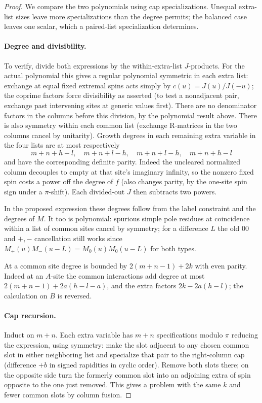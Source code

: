 \begin{proof}
We compare the two polynomials using cap specializations. Unequal extra-list sizes leave more specializations than the degree permits; the balanced case leaves one scalar, which a paired-list specialization determines.

\paragraph{Degree and divisibility.}
To verify, divide both expressions by the within-extra-list \(J\)-products. For the actual polynomial this gives a regular polynomial symmetric in each extra list: exchange at equal fixed extremal spins acts simply by \(c(u)=J(u)/J(-u)\); the coprime factors force divisibility as asserted (to test a nonadjacent pair, exchange past intervening sites at generic values first). There are no denominator factors in the columns before this division, by the polynomial result above. There is also symmetry within each common list (exchange R-matrices in the two columns cancel by unitarity). Growth degrees in each remaining extra variable in the four lists are at most respectively
\[
 m+n+h-l,\quad m+n+l-h,\quad m+n+l-h,\quad m+n+h-l
\]
and have the corresponding definite parity. Indeed the uncleared normalized column decouples to empty at that site's imaginary infinity, so the nonzero fixed spin costs a power off the degree of \(f\) (also changes parity, by the one-site spin sign under a \(\pi\)-shift). Each divided-out \(J\) then subtracts two powers.

In the proposed expression these degrees follow from the label constraint and the degrees of \(M\). It too is polynomial: spurious simple pole residues at coincidence within a list of common sites cancel by symmetry; for a difference \(L\) the old \(00\) and \(+,-\) cancellation still works since \(M_+(u)M_-(u-L)=M_0(u)M_0(u-L)\) for both types.

At a common site degree is bounded by \(2(m+n-1)+2k\) with even parity. Indeed at an \(A\)-site the common interactions add degree at most \(2(m+n-1)+2a(h-l-a)\), and the extra factors \(2k-2a(h-l)\); the calculation on \(B\) is reversed.

\paragraph{Cap recursion.}
Induct on \(m+n\). Each extra variable has \(m+n\) specifications modulo \(\pi\) reducing the expression, using symmetry: make the slot adjacent to any chosen common slot in either neighboring list and specialize that pair to the right-column cap (difference \(+b\) in signed rapidities in cyclic order). Remove both slots there; on the opposite side turn the formerly common slot into an adjoining extra of spin opposite to the one just removed. This gives a problem with the same \(k\) and fewer common slots by column fusion.


\end{proof}

